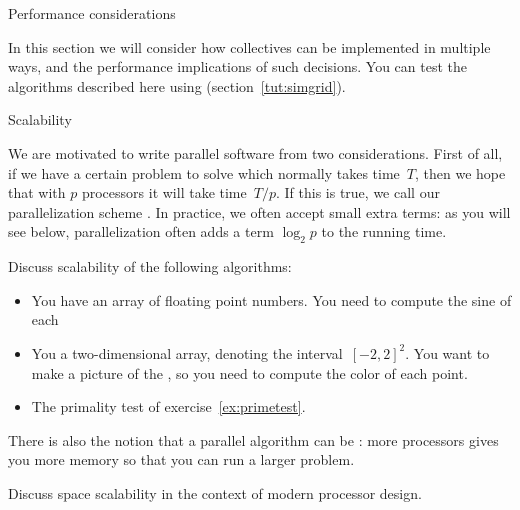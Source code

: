 
 {Performance considerations}

In this section we will consider how collectives can be implemented in
multiple ways, and the performance implications of such decisions.
You can test the algorithms described here using 
(section~\ref{tut:simgrid}).

 {Scalability}

We are motivated to write parallel software from two considerations.
First of all, if we have a certain problem to solve which normally
takes time~$T$, then we hope that with $p$ processors it will take time~$T/p$.
If this is true, we call our parallelization scheme .
In practice, we often accept small extra terms:
as you will see below, parallelization often adds a term $\log_2p$
to the running time.

\begin{exercise}
  Discuss scalability of the following algorithms:
  \begin{itemize}
  \item
    You have an array of floating point numbers.
    You need to compute the sine of each
  \item You a two-dimensional array, denoting the interval~$[-2,2]^2$.
    You want to make a picture of the ,
    so you need to compute the color of each point.
  \item The primality test of exercise~\ref{ex:primetest}.
  \end{itemize}
\end{exercise}

There is also the notion that a parallel algorithm can be
: more processors gives you more memory
so that you can run a larger problem.

\begin{exercise}
  Discuss space scalability in the context of modern processor design.
\end{exercise}

